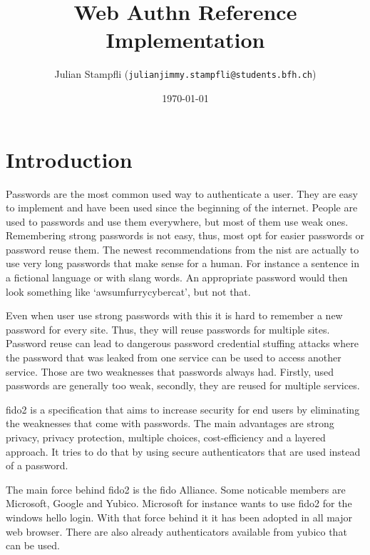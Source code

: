 \documentclass[a4paper, 11pt]{scrartcl}
\begin{document}
\title{Web Authn Reference Implementation}
\date{\today} 
\author{ Julian Stampfli (\texttt{julianjimmy.stampfli@students.bfh.ch}) }
\maketitle
\setcounter{tocdepth}{2}
\tableofcontents
\clearpage

\section{Introduction}

Passwords are the most common used way to authenticate a user. They are easy to implement and have been used since the beginning of the internet. People are used to passwords and use them everywhere, but most of them use weak ones. Remembering strong passwords is not easy, thus, most opt for easier passwords or password reuse them. The newest recommendations from the \gls{nist} are actually to use very long passwords that make sense for a human. For instance a sentence in a fictional language or with slang words. An appropriate password would then look something like `awsumfurrycybercat', but not that. \cite{nist:pw:blog}

Even when user use strong passwords with this it is hard to remember a new password for every site. Thus, they will reuse passwords for multiple sites. Password reuse can lead to dangerous password credential stuffing attacks where the password that was leaked from one service can be used to access another service. \cite{panda:pwreuse, xkcd:pwreuse} Those are two weaknesses that passwords always had. Firstly, used passwords are generally too weak, secondly, they are reused for multiple services. 

\gls{fido2} is a specification that aims to increase security for end users by eliminating the weaknesses that come with passwords. The main advantages are strong privacy, privacy protection, multiple choices, cost-efficiency and a layered approach. It tries to do that by using secure authenticators that are used instead of a password. \cite{yubico:whatIsFido2} 

The main force behind \gls{fido2} is the \gls{fido} Alliance. Some noticable members are Microsoft, Google and Yubico. Microsoft for instance wants to use \gls{fido2} for the windows hello login. \cite{yubico:ms} With that force behind it it has been adopted in all major web browser. \cite{fido:browser} There are also already authenticators available from yubico that can be used. \cite{yubico:yubikey5}
\end{document}
